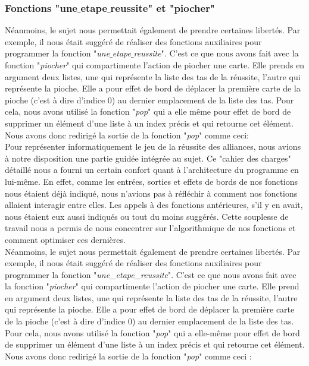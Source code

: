 \documentclass[10pt,a4paper,french,titlepage]{article}
\theoremstyle{definition}
\begin{document}
\subsubsection{Fonctions "une$\_$etape$\_$reussite" et "piocher"}
Néanmoins, le sujet nous permettait également de prendre certaines libertés. Par exemple, il nous était suggéré de réaliser des fonctions auxiliaires pour programmer la fonction "\textit{une$\_$etape$\_$reussite}". C'est ce que nous avons fait avec la fonction "\textit{piocher}" qui compartimente l'action de piocher une carte. Elle prends en argument deux listes, une qui représente la liste des tas de la réussite, l'autre qui représente la pioche. Elle a  pour effet de bord de déplacer la première carte de la pioche (c'est à dire d'indice 0) au dernier emplacement de la liste des tas. Pour cela, nous  avons utilisé la fonction "\textit{pop}" qui a elle même pour effet de bord de supprimer un élément d'une liste à un index précis et qui retourne cet élément. Nous avons donc redirigé la sortie de la fonction "\textit{pop}" comme ceci:\\
Pour représenter informatiquement le jeu de la réussite des alliances, nous avions à notre disposition une partie guidée intégrée au sujet. Ce "cahier des charges" détaillé nous a fourni un certain confort quant à l'architecture du programme en lui-même. En effet, comme les entrées, sorties et effets de bords de nos fonctions nous étaient déjà indiqué, nous n'avions pas à réfléchir à comment nos fonctions allaient interagir entre elles. Les appels à des fonctions antérieures, s'il y en avait, nous étaient eux aussi indiqués ou tout du moins suggérés. Cette souplesse de travail nous a permis de nous concentrer sur l'algorithmique de nos fonctions et comment optimiser ces dernières.\\

Néanmoins, le sujet nous permettait également de prendre certaines libertés. Par exemple, il nous était suggéré de réaliser des fonctions auxiliaires pour programmer la fonction "\textit{une\_etape\_reussite}". C'est ce que nous avons fait avec la fonction "\textit{piocher}" qui compartimente l'action de piocher une carte. Elle prend en argument deux listes, une qui représente la liste des tas de la réussite, l'autre qui représente la pioche. Elle a pour effet de bord de déplacer la première carte de la pioche (c'est à dire d'indice 0) au dernier emplacement de la liste des tas. Pour cela, nous avons utilisé la fonction "\textit{pop}" qui a elle-même pour effet de bord de supprimer un élément d'une liste à un index précis et qui retourne cet élément. Nous avons donc redirigé la sortie de la fonction "\textit{pop}" comme ceci : \\
\end{document}
